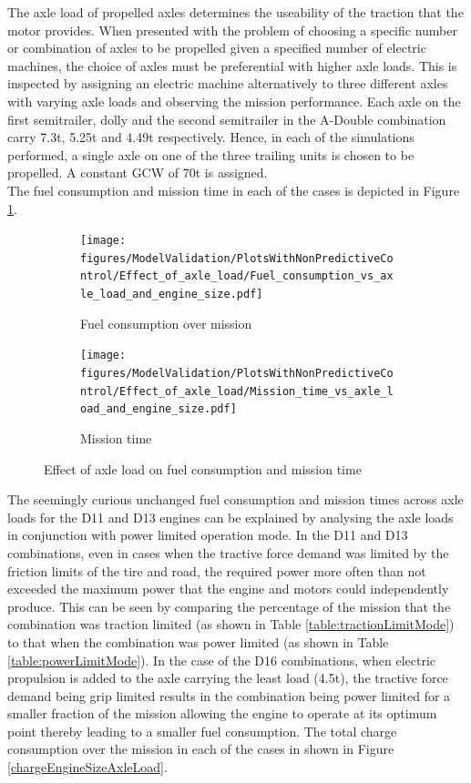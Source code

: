 \documentclass[ExampleMasters.tex]{subfiles}
\begin{document}
The axle load of propelled axles determines the useability of the traction that the motor provides. When presented with the problem of choosing a specific number or combination of axles to be propelled given a specified number of electric machines, the choice of axles must be preferential with higher axle loads. This is inspected by assigning an electric machine alternatively to three different axles with varying axle loads and observing the mission performance. Each axle on the first semitrailer, dolly and the second semitrailer in the A-Double combination carry 7.3t, 5.25t and 4.49t respectively. Hence, in each of the simulations performed, a single axle on one of the three trailing units is chosen to be propelled. A constant GCW of 70t is assigned.\\

The fuel consumption and mission time in each of the cases is depicted in Figure \ref{fuelTimeEngineAxleLoad}. 

\begin{figure}[h!]
\begin{subfigure}{.5\textwidth}
	\centering
	\texttt{[image: figures/ModelValidation/PlotsWithNonPredictiveControl/Effect\_of\_axle\_load/Fuel\_consumption\_vs\_axle\_load\_and\_engine\_size.pdf]}
	\caption{Fuel consumption over mission}
\end{subfigure}
\begin{subfigure}{.5\textwidth}
	\centering
	\texttt{[image: figures/ModelValidation/PlotsWithNonPredictiveControl/Effect\_of\_axle\_load/Mission\_time\_vs\_axle\_load\_and\_engine\_size.pdf]}
	\caption{Mission time}
\end{subfigure}
\caption{Effect of axle load on fuel consumption and mission time}
\label{fuelTimeEngineAxleLoad}
\end{figure}

The seemingly curious unchanged fuel consumption and mission times across axle loads for the D11 and D13 engines can be explained by analysing the axle loads in conjunction with power limited operation mode. In the D11 and D13 combinations, even in cases when the tractive force demand was limited by the friction limits of the tire and road, the required power more often than not exceeded the maximum power that the engine and motors could independently produce. This can be seen by comparing the percentage of the mission that the combination was traction limited (as shown in Table \ref{table:tractionLimitMode}) to that when the combination was power limited (as shown in Table \ref{table:powerLimitMode}). In the case of the D16 combinations, when electric propulsion is added to the axle carrying the least load (4.5t), the tractive force demand being grip limited results in the combination being power limited for a smaller fraction of the mission allowing the engine to operate at its optimum point thereby leading to a smaller fuel consumption. The total charge consumption over the mission in each of the cases in shown in Figure \ref{chargeEngineSizeAxleLoad}.\\
\end{document}
